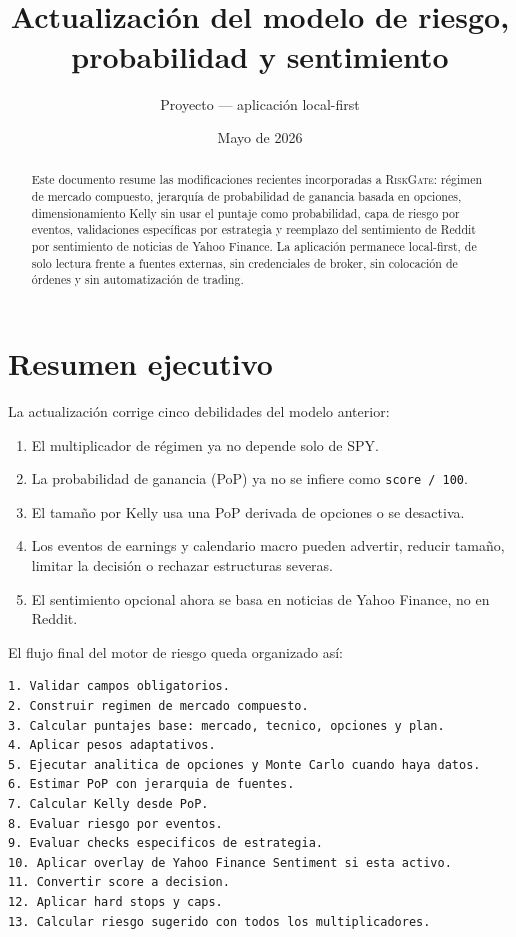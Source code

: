 \documentclass[11pt,letterpaper]{article}
\title{\textbf{\RiskGate}\\[2mm]
\large Actualizaci\'on del modelo de riesgo, probabilidad y sentimiento}
\author{Proyecto \RiskGate{} --- aplicaci\'on local-first}
\date{Mayo de 2026}
\newcommand{\RiskGate}{\textsc{RiskGate}}
\begin{document}
\maketitle

\begin{abstract}
\noindent
Este documento resume las modificaciones recientes incorporadas a \RiskGate{}:
r\'egimen de mercado compuesto, jerarqu\'ia de probabilidad de ganancia basada en
opciones, dimensionamiento Kelly sin usar el puntaje como probabilidad, capa de
riesgo por eventos, validaciones espec\'ificas por estrategia y reemplazo del
sentimiento de Reddit por sentimiento de noticias de Yahoo Finance. La
aplicaci\'on permanece local-first, de solo lectura frente a fuentes externas,
sin credenciales de broker, sin colocaci\'on de \'ordenes y sin automatizaci\'on de
trading.
\end{abstract}

\tableofcontents
\newpage

\section{Resumen ejecutivo}

La actualizaci\'on corrige cinco debilidades del modelo anterior:

\begin{enumerate}[noitemsep]
  \item El multiplicador de r\'egimen ya no depende solo de SPY.
  \item La probabilidad de ganancia (PoP) ya no se infiere como
        \texttt{score / 100}.
  \item El tama\~no por Kelly usa una PoP derivada de opciones o se desactiva.
  \item Los eventos de earnings y calendario macro pueden advertir, reducir
        tama\~no, limitar la decisi\'on o rechazar estructuras severas.
  \item El sentimiento opcional ahora se basa en noticias de Yahoo Finance,
        no en Reddit.
\end{enumerate}

El flujo final del motor de riesgo queda organizado as\'i:

\begin{lstlisting}
1. Validar campos obligatorios.
2. Construir regimen de mercado compuesto.
3. Calcular puntajes base: mercado, tecnico, opciones y plan.
4. Aplicar pesos adaptativos.
5. Ejecutar analitica de opciones y Monte Carlo cuando haya datos.
6. Estimar PoP con jerarquia de fuentes.
7. Calcular Kelly desde PoP.
8. Evaluar riesgo por eventos.
9. Evaluar checks especificos de estrategia.
10. Aplicar overlay de Yahoo Finance Sentiment si esta activo.
11. Convertir score a decision.
12. Aplicar hard stops y caps.
13. Calcular riesgo sugerido con todos los multiplicadores.
\end{lstlisting}
\end{document}
